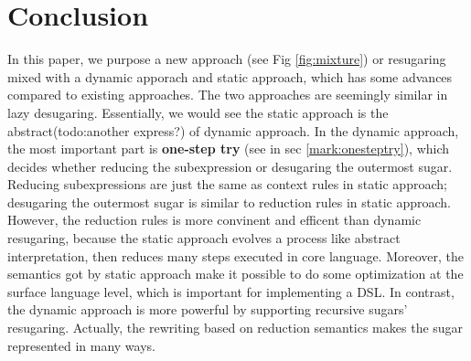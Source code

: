 \section{Conclusion}
\label{sec6}


In this paper, we purpose a new approach (see Fig \ref{fig:mixture}) or resugaring mixed with a dynamic apporach and static approach, which has some advances compared to existing approaches. The two approaches are seemingly similar in lazy desugaring. Essentially, we would see the static approach is the abstract(todo:another express?) of dynamic approach. In the dynamic approach, the most important part is {\bfseries one-step try} (see in sec \ref{mark:onesteptry}), which decides whether reducing the subexpression or desugaring the outermost sugar. Reducing subexpressions are just the same as context rules in static approach; desugaring the outermost sugar is similar to reduction rules in static approach. However, the reduction rules is more convinent and efficent than dynamic resugaring, because the static approach evolves a process like abstract interpretation\cite{AbstractInterpretation}, then reduces many steps executed in core language. Moreover, the semantics got by static approach make it possible to do some optimization at the surface language level, which is important for implementing a DSL. In contrast, the dynamic approach is more powerful by supporting recursive sugars' resugaring. Actually, the rewriting based on reduction semantics makes the sugar represented in many ways.